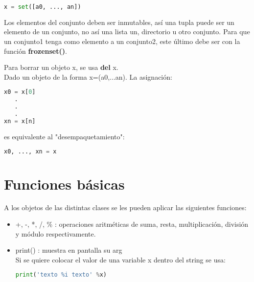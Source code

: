 \documentclass[10pt,oneside]{article}
\begin{document}
\begin{multicols}{2}
\begin{itemize}
                \begin{lstlisting}[language=Python]
x = set([a0, ..., an])   
                \end{lstlisting}

                Los elementos del conjunto deben ser inmutables, así una tupla puede ser un elemento de un conjunto, no así una lista un, directorio u otro conjunto. Para que un conjunto1 tenga como elemento a un conjunto2, este último debe ser con la función \textbf{frozenset()}.

                
                
                
            \end{itemize}
            
            Para borrar un objeto x, se usa \textbf{del} x.\\ \newline Dado un objeto de la forma x=(a0,...an). La asignación:

            \begin{lstlisting}[language=Python]
x0 = x[0]
   .
   .
   .
xn = x[n]
            \end{lstlisting}

            es equivalente al "desempaquetamiento":

            \begin{lstlisting}[language=Python]
x0, ..., xn = x                
            \end{lstlisting}

        \section{Funciones básicas}

            A los objetos de las distintas clases se les pueden aplicar las siguientes funciones:

            \begin{itemize}
                \item +, -, *, /, \% : operaciones aritméticas de suma, resta, multiplicación, división y módulo respectivamente.
                \item print() : muestra en pantalla su arg\\ \newline Si se quiere colocar el valor de una variable x dentro del string se usa:

                \begin{lstlisting}[language=Python]
print('texto %i texto' %x)   
                \end{lstlisting}
                

\end{itemize}
\end{multicols}
\end{document}
